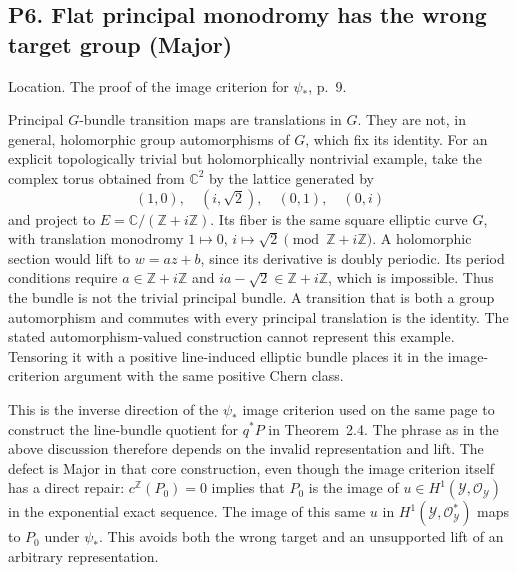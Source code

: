 \documentclass[10pt]{article}
\begin{document}
\subsection*{P6. Flat principal monodromy has the wrong target group (Major)}
Location. The proof of the image criterion for \(\psi_*\), p. 9.\par
Principal \(G\)-bundle transition maps are translations in \(G\). They are not, in general, holomorphic group automorphisms of \(G\), which fix its identity. For an explicit topologically trivial but holomorphically nontrivial example, take the complex torus obtained from \(\mathbb C^2\) by the lattice generated by \[(1,0),\quad(i,\sqrt2),\quad(0,1),\quad(0,i)\] and project to \(E=\mathbb C/(\mathbb Z+i\mathbb Z)\). Its fiber is the same square elliptic curve \(G\), with translation monodromy \(1\mapsto0\), \(i\mapsto\sqrt2\pmod{\mathbb Z+i\mathbb Z}\). A holomorphic section would lift to \(w=az+b\), since its derivative is doubly periodic. Its period conditions require \(a\in\mathbb Z+i\mathbb Z\) and \(ia-\sqrt2\in\mathbb Z+i\mathbb Z\), which is impossible. Thus the bundle is not the trivial principal bundle. A transition that is both a group automorphism and commutes with every principal translation is the identity. The stated automorphism-valued construction cannot represent this example. Tensoring it with a positive line-induced elliptic bundle places it in the image-criterion argument with the same positive Chern class.\par
This is the inverse direction of the \(\psi_*\) image criterion used on the same page to construct the line-bundle quotient for \(q^*P\) in Theorem 2.4. The phrase as in the above discussion therefore depends on the invalid representation and lift. The defect is Major in that core construction, even though the image criterion itself has a direct repair: \(c^{\mathbb Z}(P_0)=0\) implies that \(P_0\) is the image of \(u\in H^1(\mathcal Y,\mathcal O_\mathcal Y)\) in the exponential exact sequence. The image of this same \(u\) in \(H^1(\mathcal Y,\mathcal O_\mathcal Y^*)\) maps to \(P_0\) under \(\psi_*\). This avoids both the wrong target and an unsupported lift of an arbitrary representation.\par
\end{document}

